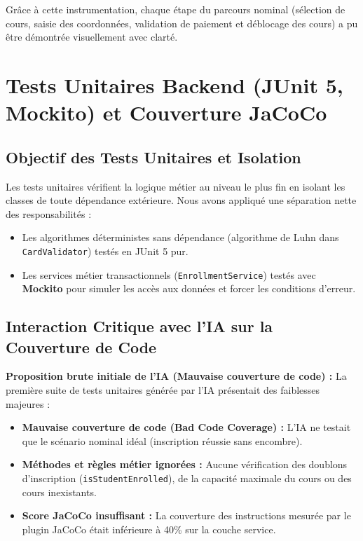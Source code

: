 \documentclass[11pt, a4paper, openany]{report}
\begin{document}
Grâce à cette instrumentation, chaque étape du parcours nominal (sélection de cours, saisie des coordonnées, validation de paiement et déblocage des cours) a pu être démontrée visuellement avec clarté.

\chapter{Tests Unitaires Backend (JUnit 5, Mockito) et Couverture JaCoCo}

\section{Objectif des Tests Unitaires et Isolation}
Les tests unitaires vérifient la logique métier au niveau le plus fin en isolant les classes de toute dépendance extérieure. Nous avons appliqué une séparation nette des responsabilités :
\begin{itemize}[label=\textbullet, itemsep=2pt]
    \item Les algorithmes déterministes sans dépendance (algorithme de Luhn dans \texttt{CardValidator}) testés en JUnit 5 pur.
    \item Les services métier transactionnels (\texttt{EnrollmentService}) testés avec \textbf{Mockito} pour simuler les accès aux données et forcer les conditions d'erreur.
\end{itemize}

\section{Interaction Critique avec l'IA sur la Couverture de Code}

\begin{aiCritiqueBox}
\textbf{Proposition brute initiale de l'IA (Mauvaise couverture de code) :}
La première suite de tests unitaires générée par l'IA présentait des faiblesses majeures :
\begin{itemize}[label=$\times$, itemsep=1pt]
    \item \textbf{Mauvaise couverture de code (Bad Code Coverage) :} L'IA ne testait que le scénario nominal idéal (inscription réussie sans encombre).
    \item \textbf{Méthodes et règles métier ignorées :} Aucune vérification des doublons d'inscription (\texttt{isStudentEnrolled}), de la capacité maximale du cours ou des cours inexistants.
    \item \textbf{Score JaCoCo insuffisant :} La couverture des instructions mesurée par le plugin JaCoCo était inférieure à 40\% sur la couche service.
\end{itemize}
\end{aiCritiqueBox}
\end{document}
